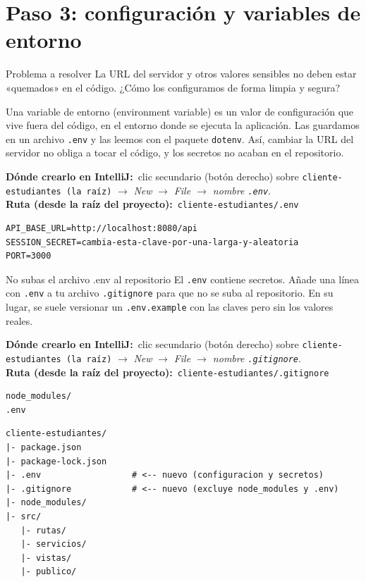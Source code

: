 \documentclass[11pt]{article}
\newcommand{\dondecrear}[3]{\begin{ubic}{\footnotesize\textbf{\color{ndverdeo}D\'onde crearlo en IntelliJ:}~clic secundario (bot\'on derecho) sobre \texttt{#1} $\rightarrow$ \emph{New} $\rightarrow$ \emph{#2}.\\[2pt]\textbf{\color{ndverdeo}Ruta (desde la ra\'iz del proyecto):}~\texttt{#3}}\end{ubic}\nobreak\vspace{3pt}}
\begin{document}
\section{Paso 3: configuración y variables de entorno}
\begin{cajaproblema}{Problema a resolver}
La URL del servidor y otros valores sensibles no deben estar «quemados» en el código. ¿Cómo los configuramos de forma limpia y segura?\par
\end{cajaproblema}
Una variable de entorno (environment variable) es un valor de configuración que vive fuera del código, en el entorno donde se ejecuta la aplicación. Las guardamos en un archivo \texttt{.env} y las leemos con el paquete \texttt{dotenv}. Así, cambiar la URL del servidor no obliga a tocar el código, y los secretos no acaban en el repositorio.

\dondecrear{cliente-estudiantes (la raíz)}{File $\rightarrow$ nombre \texttt{.env}}{cliente-estudiantes/.env}
\begin{cajacodigo}[.env]
\begin{lstlisting}[style=markup]
API_BASE_URL=http://localhost:8080/api
SESSION_SECRET=cambia-esta-clave-por-una-larga-y-aleatoria
PORT=3000
\end{lstlisting}
\end{cajacodigo}
\vspace{2pt}
\begin{cajawarn}{No subas el archivo .env al repositorio}
El \texttt{.env} contiene secretos. Añade una línea con \texttt{.env} a tu archivo \texttt{.gitignore} para que no se suba al repositorio. En su lugar, se suele versionar un \texttt{.env.example} con las claves pero sin los valores reales.\par
\end{cajawarn}

\dondecrear{cliente-estudiantes (la raíz)}{File $\rightarrow$ nombre \texttt{.gitignore}}{cliente-estudiantes/.gitignore}
\begin{cajacodigo}[.gitignore]
\begin{lstlisting}[style=markup]
node_modules/
.env
\end{lstlisting}
\end{cajacodigo}
\vspace{2pt}

\begin{cajacodigo}
\begin{lstlisting}[style=markup]
cliente-estudiantes/
|- package.json
|- package-lock.json
|- .env                  # <-- nuevo (configuracion y secretos)
|- .gitignore            # <-- nuevo (excluye node_modules y .env)
|- node_modules/
|- src/
   |- rutas/
   |- servicios/
   |- vistas/
   |- publico/
\end{lstlisting}
\end{cajacodigo}
\vspace{2pt}
\end{document}
